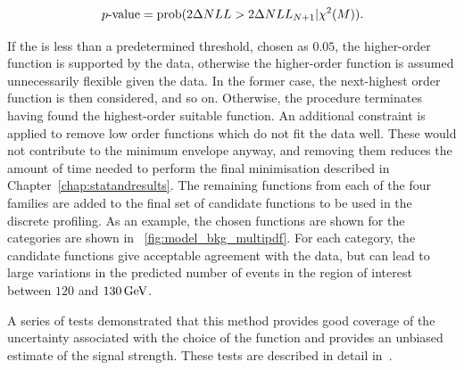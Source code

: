 $$ \text{\ensuremath{\,p{\text{-value}}}} = \text{prob}(2 \Delta NLL > 2 \Delta NLL_{N+1}| \chi^2(M)). $$

If the \pvalue is less than a predetermined threshold, chosen as $0.05$, the higher-order function is supported by the data, otherwise the higher-order function is assumed unnecessarily flexible given the data. In the former case, the next-highest order function is then considered, and so on. Otherwise, the procedure terminates having found the highest-order suitable function. An additional constraint is applied to remove low order functions which do not fit the data well. These would not contribute to the minimum envelope anyway, and removing them reduces the amount of time needed to perform the final minimisation described in Chapter~\ref{chap:statandresults}. The remaining functions from each of the four families are added to the final set of candidate functions to be used in the discrete profiling. As an example, the chosen functions are shown for the \Untagged categories are shown in \Fig~\ref{fig:model_bkg_multipdf}. For each category, the candidate functions give acceptable agreement with the data, but can lead to large variations in the predicted number of events in the region of interest between $120$ and $130\,\text{Ge\hspace{-.08em}V}$. %

A series of tests demonstrated that this method provides good coverage of the uncertainty associated with the choice of the function and provides an unbiased estimate of the signal strength. These tests are described in detail in~\cite{DiscreteProfiling}. 


